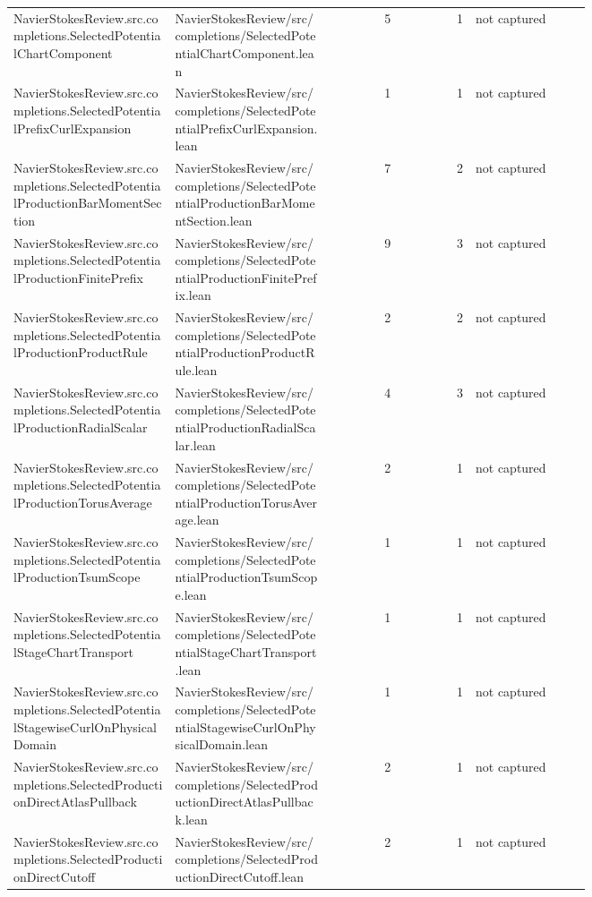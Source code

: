 \documentclass[10pt]{article}
\begin{document}
\begin{longtable}{p{0.28\linewidth}p{0.27\linewidth}r r p{0.20\linewidth}}
NavierStokesReview.src.completions.SelectedPotentialChartComponent & NavierStokesReview/src/completions/SelectedPotentialChartComponent.lean & 5 & 1 & not captured\\
NavierStokesReview.src.completions.SelectedPotentialPrefixCurlExpansion & NavierStokesReview/src/completions/SelectedPotentialPrefixCurlExpansion.lean & 1 & 1 & not captured\\
NavierStokesReview.src.completions.SelectedPotentialProductionBarMomentSection & NavierStokesReview/src/completions/SelectedPotentialProductionBarMomentSection.lean & 7 & 2 & not captured\\
NavierStokesReview.src.completions.SelectedPotentialProductionFinitePrefix & NavierStokesReview/src/completions/SelectedPotentialProductionFinitePrefix.lean & 9 & 3 & not captured\\
NavierStokesReview.src.completions.SelectedPotentialProductionProductRule & NavierStokesReview/src/completions/SelectedPotentialProductionProductRule.lean & 2 & 2 & not captured\\
NavierStokesReview.src.completions.SelectedPotentialProductionRadialScalar & NavierStokesReview/src/completions/SelectedPotentialProductionRadialScalar.lean & 4 & 3 & not captured\\
NavierStokesReview.src.completions.SelectedPotentialProductionTorusAverage & NavierStokesReview/src/completions/SelectedPotentialProductionTorusAverage.lean & 2 & 1 & not captured\\
NavierStokesReview.src.completions.SelectedPotentialProductionTsumScope & NavierStokesReview/src/completions/SelectedPotentialProductionTsumScope.lean & 1 & 1 & not captured\\
NavierStokesReview.src.completions.SelectedPotentialStageChartTransport & NavierStokesReview/src/completions/SelectedPotentialStageChartTransport.lean & 1 & 1 & not captured\\
NavierStokesReview.src.completions.SelectedPotentialStagewiseCurlOnPhysicalDomain & NavierStokesReview/src/completions/SelectedPotentialStagewiseCurlOnPhysicalDomain.lean & 1 & 1 & not captured\\
NavierStokesReview.src.completions.SelectedProductionDirectAtlasPullback & NavierStokesReview/src/completions/SelectedProductionDirectAtlasPullback.lean & 2 & 1 & not captured\\
NavierStokesReview.src.completions.SelectedProductionDirectCutoff & NavierStokesReview/src/completions/SelectedProductionDirectCutoff.lean & 2 & 1 & not captured\\

\end{longtable}
\end{document}
